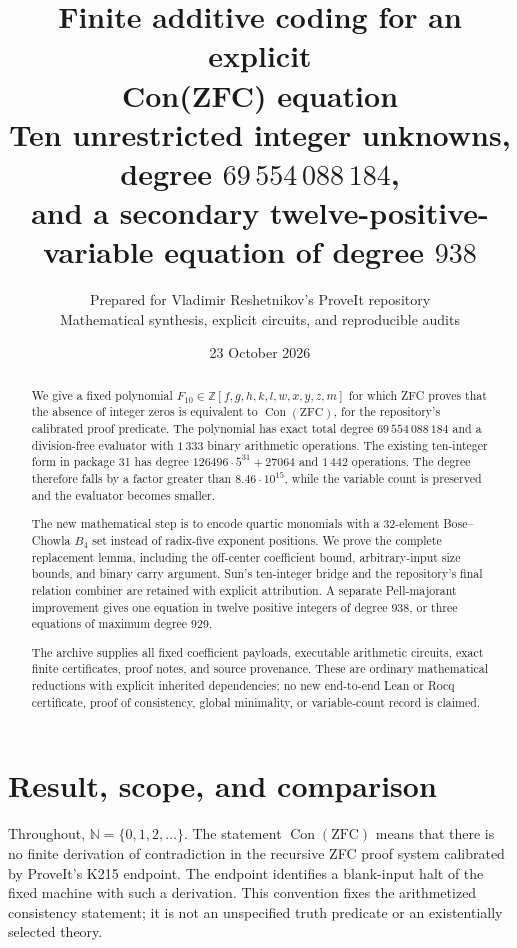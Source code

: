 \documentclass[11pt,letterpaper]{article}
\title{\textbf{Finite additive coding for an explicit\\Con(ZFC) equation}\\[7pt]
\large Ten unrestricted integer unknowns, degree \(69\,554\,088\,184\),\\
and a secondary twelve-positive-variable equation of degree \(938\)}
\author{Prepared for Vladimir Reshetnikov's ProveIt repository\\
\small Mathematical synthesis, explicit circuits, and reproducible audits}
\date{23 October 2026}
\newcommand{\Z}{\mathbb Z}
\newcommand{\N}{\mathbb N}
\newcommand{\Con}{\operatorname{Con}}
\newcommand{\ZFC}{\mathrm{ZFC}}
\theoremstyle{remark}
\begin{document}
\maketitle
\begin{abstract}
We give a fixed polynomial \(F_{10}\in\Z[f,g,h,k,l,w,x,y,z,m]\) for which
ZFC proves that the absence of integer zeros is equivalent to
\(\Con(\ZFC)\), for the repository's calibrated proof predicate.
The polynomial has exact total degree \(69\,554\,088\,184\) and a
division-free evaluator with \(1\,333\) binary arithmetic operations.
The existing ten-integer form in package 31 has degree
\(126496\cdot5^{31}+27064\) and \(1\,442\) operations. The degree therefore
falls by a factor greater than \(8.46\cdot10^{15}\), while the variable
count is preserved and the evaluator becomes smaller.

The new mathematical step is to encode quartic monomials with a
32-element Bose--Chowla \(B_4\) set instead of radix-five exponent
positions. We prove the complete replacement lemma, including the
off-center coefficient bound, arbitrary-input size bounds, and binary
carry argument. Sun's ten-integer bridge and the repository's final
relation combiner are retained with explicit attribution. A separate
Pell-majorant improvement gives one equation in twelve positive integers
of degree \(938\), or three equations of maximum degree \(929\).

The archive supplies all fixed coefficient payloads, executable
arithmetic circuits, exact finite certificates, proof notes, and source
provenance. These are ordinary mathematical reductions with explicit
inherited dependencies; no new end-to-end Lean or Rocq certificate,
proof of consistency, global minimality, or variable-count record is claimed.
\end{abstract}
\clearpage
\tableofcontents
\newpage

\section{Result, scope, and comparison}
\label{sec:results}

Throughout, \(\N=\{0,1,2,\ldots\}\). The statement \(\Con(\ZFC)\) means
that there is no finite derivation of contradiction in the recursive
ZFC proof system calibrated by ProveIt's K215 endpoint. The endpoint
identifies a blank-input halt of the fixed machine with such a derivation.
This convention fixes the arithmetized consistency statement; it is not
an unspecified truth predicate or an existentially selected theory.
\end{document}
